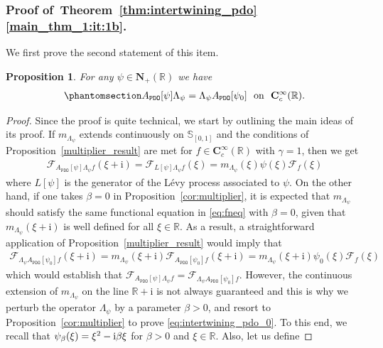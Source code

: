 \documentclass[12pt]{amsart}
\newcommand{\hlabel}{\phantomsection\label}
\numberwithin{equation}{section}
\newcommand{\bb}{\mathbb}
\newcommand{\ttt}{\mathtt}
\newcommand{\fou}{\mathcal{F}}
\newcommand{\C}{\mathbf{C}}
\renewcommand{\i}{\mathrm{i}}
\newcommand{\NN}{\mathbf{N}}
\newtheorem{prop}[thm]{Proposition}
\theoremstyle{definition}
\theoremstyle{assump}
\theoremstyle{remark}
\begin{document}
{\subsubsection{Proof of~Theorem~\ref{thm:intertwining_pdo}\eqref{main_thm_1:it:1b}.} %
We first prove the second statement of this item.
\begin{prop}\hlabel{prop:intertwining_test}
	For any $\psi\in\NN_+(\bb R)$ we have
	\begin{align}\hlabel{eq:intertwining_pdo_0}
		A_\ttt{PDO}[\psi]\Lambda_\psi =\Lambda_\psi A_\ttt{PDO}[\psi_0]\ \mbox{ on } \ \C^\infty_c(\bb R).
	\end{align}
\end{prop}
\begin{proof}
 Since the proof is quite technical, we start by outlining the main ideas of its proof. If $m_{\Lambda_\psi}$ extends continuously on $\bb{S}_{[0,1]}$ and the conditions of Proposition~\ref{multiplier_result} are met for $f\in\C^\infty_c(\bb R)$ with $\gamma=1$, then we get
\begin{align*}
	\fou_{\! A_\ttt{PDO}[\psi]\Lambda_\psi f}(\xi+\i)=\fou_{L[\psi]\Lambda_\psi f}(\xi)=m_{\Lambda_\psi}(\xi)\psi(\xi)\fou_f(\xi)
\end{align*}
where $L[\psi]$ is the generator of the L\'evy process associated to $\psi$. On the other hand, if one takes $\beta=0$ in Proposition~\ref{cor:multiplier}, it is expected that $m_{\Lambda_\psi}$ should satisfy the same functional equation in \eqref{eq:fneq} with $\beta=0$, given that $m_{\Lambda_\psi}(\xi+\i)$ is well defined for all $\xi\in\bb R$. As a result, a straightforward application of Proposition~\ref{multiplier_result} would imply that
\begin{align*}
	\fou_{\Lambda_\psi A_\ttt{PDO}[\psi_0] f}(\xi+\i)=m_{\Lambda_\psi}(\xi+\i)\fou_{\! A_\ttt{PDO}[\psi_0] f}(\xi+\i)=m_{\Lambda_\psi}(\xi+\i)\psi_0(\xi)\fou_{f}(\xi)
\end{align*}
which would establish that $\fou_{\! A_\ttt{PDO}[\psi]\Lambda_\psi f}=\fou_{\Lambda_\psi A_\ttt{PDO}[\psi_0]f}$. However, the continuous extension of $m_{\Lambda_\psi}$ on the line $\bb R+\i$ is not always guaranteed and this is why we perturb the operator $\Lambda_\psi$ by a parameter $\beta>0$, and resort to Proposition~\ref{cor:multiplier} to prove \eqref{eq:intertwining_pdo_0}. To this end, we recall that $\psi_\beta(\xi)=\xi^2-{\rm{i}}\beta\xi$ for $\beta>0$ and $\xi \in \bb{R}$. Also, let us define

\end{proof}}
\end{document}

